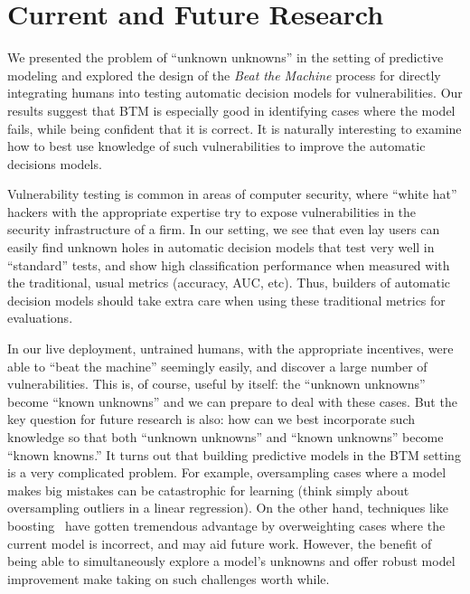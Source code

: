 \section{Current and Future Research}


We presented the problem of ``unknown unknowns'' in the setting of predictive modeling and explored the design of the \emph{Beat the Machine} process for directly integrating humans into testing automatic decision models for vulnerabilities. Our results suggest that BTM is especially good in identifying cases where the model fails, while being confident that it is correct.  It is naturally interesting to examine how to best use knowledge of such vulnerabilities to improve the automatic decisions models. 


Vulnerability testing is common in areas of computer security, where ``white hat'' hackers with the appropriate expertise try to expose vulnerabilities in the security infrastructure of a firm. In our setting, we see that even lay users can easily find unknown holes in automatic decision models that test very well in ``standard'' tests, and show high classification performance when measured with the traditional, usual metrics (accuracy, AUC, etc).  Thus, builders of automatic decision models should take extra care when using these
traditional metrics for evaluations.

In our live deployment, untrained humans, with the appropriate incentives, were able to ``beat the machine'' seemingly easily, and discover a large number of vulnerabilities. This is, of course, useful by itself: the ``unknown unknowns'' become ``known unknowns'' and we can prepare to deal with these cases. But the key question for future research is also: how can we best incorporate such knowledge so that both ``unknown unknowns'' and ``known unknowns'' become ``known knowns.'' It turns out that building predictive models in the BTM setting is a very complicated problem. For example, oversampling cases where a model makes big mistakes can be catastrophic for  learning (think simply about oversampling outliers in a linear regression). On the other hand, techniques like boosting~\cite{Freund99ashort} have gotten tremendous advantage by overweighting cases where the current model is incorrect, and may aid future work. However, the benefit of being able to simultaneously explore a model's unknowns and offer robust model improvement make taking on such challenges worth while.

